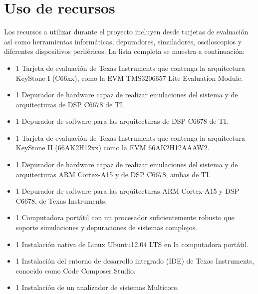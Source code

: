 
\chapter{Uso de recursos}
\label{ch:Uso_de_recursos}

Los recursos a utilizar durante el proyecto incluyen desde tarjetas de evaluación así 
como herramientas informáticas, depuradores, simuladores, osciloscopios y diferentes dispositivos periféricos.
La lista completa se muestra a continuación:

\begin{itemize}
 \item 1 Tarjeta de evaluación de Texas Instruments que contenga la
  arquitectura KeyStone I (C66xx), como la EVM TMS3206657 Lite
  Evaluation Module.
 \item 1 Depurador de hardware capaz de realizar emulaciones del
  sistema y de arquitecturas de DSP C6678 de TI.
 \item 1 Depurador de software para las arquitecturas de DSP C6678 de
  TI.
 \item 1 Tarjeta de evaluación de Texas Instruments que contenga la
  arquitectura KeyStone II (66AK2H12xx) como la EVM 66AK2H12AAAW2.
 \item 1 Depurador de hardware capaz de realizar emulaciones del
  sistema y de arquitecturas ARM Cortex-A15 y de DSP C6678,
  ambas de TI.
 \item 1 Depurador de software para las arquitecturas ARM Cortex-A15
  y DSP C6678, de Texas Instruments.
 \item 1 Computadora portátil con un procesador suficientemente
  robusto que soporte simulaciones y depuraciones de sistemas
  complejos.
 \item 1 Instalación nativa de Linux Ubuntu12.04 LTS en la computadora
  portátil.
 \item 1 Instalación del entorno de desarrollo integrado (IDE) de Texas
  Instruments, conocido como Code Composer Studio.
 \item 1 Instalación de un analizador de sistemas Multicore.

\end{itemize}


